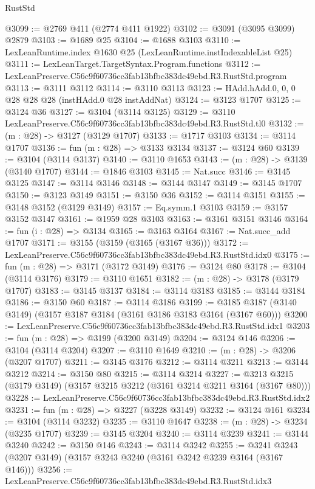 \begin{lexlean}{RustStd}
\begin{coremodule}
@3099 := @2769 @411 (@2774 @411 @1922)
@3102 := @3091 (@3095 @3099) @2879
@3103 := @1689 @25
@3104 := @1688 @3103
@3110 := LexLeanRuntime.index @1630 @25 (LexLeanRuntime.instIndexableList @25)
@3111 := LexLeanTarget.TargetSyntax.Program.functions
@3112 := LexLeanPreserve.C56c9f60736cc3fab13bfbc383dc49ebd.R3.RustStd.program
@3113 := @3111 @3112
@3114 := @3110 @3113
@3123 := HAdd.hAdd.{0, 0, 0} @28 @28 @28 (instHAdd.{0} @28 instAddNat)
@3124 := @3123 @1707
@3125 := @3124 @36
@3127 := @3104 (@3114 @3125)
@3129 := @3110 LexLeanPreserve.C56c9f60736cc3fab13bfbc383dc49ebd.R3.RustStd.tl0
@3132 := (m : @28) -> @3127 (@3129 @1707)
@3133 := @1717 @3103
@3134 := @3114 @1707
@3136 := fun (m : @28) => @3133 @3134
@3137 := @3124 @60
@3139 := @3104 (@3114 @3137)
@3140 := @3110 @1653
@3143 := (m : @28) -> @3139 (@3140 @1707)
@3144 := @1846 @3103
@3145 := Nat.succ
@3146 := @3145 @3125
@3147 := @3114 @3146
@3148 := @3144 @3147
@3149 := @3145 @1707
@3150 := @3123 @3149
@3151 := @3150 @36
@3152 := @3114 @3151
@3155 := @3148 @3152 (@3129 @3149)
@3157 := Eq.symm.{1} @3103
@3159 := @3157 @3152 @3147
@3161 := @1959 @28 @3103
@3163 := @3161 @3151 @3146
@3164 := fun (i : @28) => @3134
@3165 := @3163 @3164
@3167 := Nat.succ_add @1707
@3171 := @3155 (@3159 (@3165 (@3167 @36)))
@3172 := LexLeanPreserve.C56c9f60736cc3fab13bfbc383dc49ebd.R3.RustStd.idx0
@3175 := fun (m : @28) => @3171 (@3172 @3149)
@3176 := @3124 @80
@3178 := @3104 (@3114 @3176)
@3179 := @3110 @1651
@3182 := (m : @28) -> @3178 (@3179 @1707)
@3183 := @3145 @3137
@3184 := @3114 @3183
@3185 := @3144 @3184
@3186 := @3150 @60
@3187 := @3114 @3186
@3199 := @3185 @3187 (@3140 @3149) (@3157 @3187 @3184 (@3161 @3186 @3183 @3164 (@3167 @60)))
@3200 := LexLeanPreserve.C56c9f60736cc3fab13bfbc383dc49ebd.R3.RustStd.idx1
@3203 := fun (m : @28) => @3199 (@3200 @3149)
@3204 := @3124 @146
@3206 := @3104 (@3114 @3204)
@3207 := @3110 @1649
@3210 := (m : @28) -> @3206 (@3207 @1707)
@3211 := @3145 @3176
@3212 := @3114 @3211
@3213 := @3144 @3212
@3214 := @3150 @80
@3215 := @3114 @3214
@3227 := @3213 @3215 (@3179 @3149) (@3157 @3215 @3212 (@3161 @3214 @3211 @3164 (@3167 @80)))
@3228 := LexLeanPreserve.C56c9f60736cc3fab13bfbc383dc49ebd.R3.RustStd.idx2
@3231 := fun (m : @28) => @3227 (@3228 @3149)
@3232 := @3124 @161
@3234 := @3104 (@3114 @3232)
@3235 := @3110 @1647
@3238 := (m : @28) -> @3234 (@3235 @1707)
@3239 := @3145 @3204
@3240 := @3114 @3239
@3241 := @3144 @3240
@3242 := @3150 @146
@3243 := @3114 @3242
@3255 := @3241 @3243 (@3207 @3149) (@3157 @3243 @3240 (@3161 @3242 @3239 @3164 (@3167 @146)))
@3256 := LexLeanPreserve.C56c9f60736cc3fab13bfbc383dc49ebd.R3.RustStd.idx3

\end{coremodule}
\end{lexlean}
